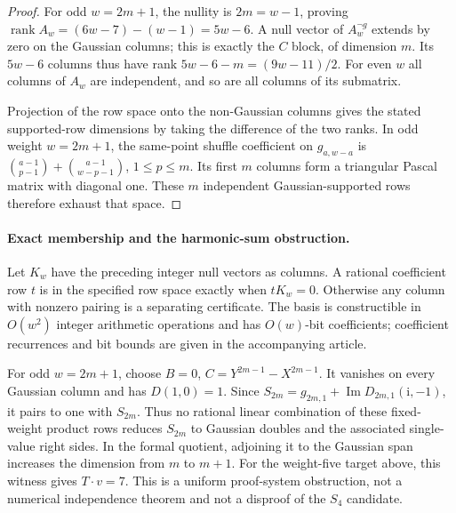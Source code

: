 \begin{proof}
For odd $w=2m+1$, the nullity is $2m=w-1$, proving
$\operatorname{rank}A_w=(6w-7)-(w-1)=5w-6$. A null vector of
$A_w^{\neg g}$ extends by zero on the Gaussian columns; this is exactly
the $C$ block, of dimension $m$. Its $5w-6$ columns thus have rank
$5w-6-m=(9w-11)/2$. For even $w$ all columns of $A_w$ are independent,
and so are all columns of its submatrix.

Projection of the row space onto the non-Gaussian columns gives the stated
supported-row dimensions by taking the difference of the two ranks. In odd
weight $w=2m+1$, the same-point shuffle coefficient on $g_{a,w-a}$ is
$\binom{a-1}{p-1}+\binom{a-1}{w-p-1}$, $1\le p\le m$.
Its first $m$ columns form a triangular Pascal matrix with diagonal one.
These $m$ independent Gaussian-supported rows therefore exhaust that space.
\end{proof}

\paragraph{Exact membership and the harmonic-sum obstruction.}
Let $K_w$ have the preceding integer null vectors as columns. A rational
coefficient row $t$ is in the specified row space exactly when $tK_w=0$.
Otherwise any column with nonzero pairing is a separating certificate.
The basis is constructible in $O(w^2)$ integer arithmetic operations and
has $O(w)$-bit coefficients; coefficient recurrences and bit bounds are
given in the accompanying article.

For odd $w=2m+1$, choose $B=0$, $C=Y^{2m-1}-X^{2m-1}$.
It vanishes on every Gaussian column and has $D(1,0)=1$.
Since $S_{2m}=g_{2m,1}+\operatorname{Im}D_{2m,1}(\mathrm i,-1)$,
it pairs to one with $S_{2m}$. Thus no rational linear combination of these
fixed-weight product rows reduces $S_{2m}$ to Gaussian doubles and the
associated single-value right sides. In the formal quotient, adjoining it
to the Gaussian span increases the dimension from $m$ to $m+1$.
For the weight-five target above, this witness gives $T\cdot v=7$.
This is a uniform proof-system obstruction, not a numerical independence
theorem and not a disproof of the $S_4$ candidate.

